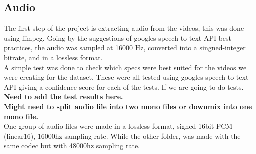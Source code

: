 \documentclass[12pt]{article}
\begin{document}
\subsection{Audio}
The first step of the project is extracting audio from the videos, this was done using ffmpeg. Going by the suggestions of googles speech-to-text API best practices, the audio was sampled at 16000 Hz, converted into a singned-integer bitrate, and in a lossless format.\\
A simple test was done to check which specs were best suited for the videos we were creating for the dataset. These were all tested using googles speech-to-text API giving a confidence score for each of the tests. If we are going to do tests.\\  \textbf{Need to add the test results here. \\ Might need to split audio file into two mono files or downmix into one mono file.}
\\
One group of audio files were made in a lossless format, signed 16bit PCM (linear16), 16000hz sampling rate. While the other folder, was made with the same codec but with 48000hz sampling rate.  
\\
\end{document}
